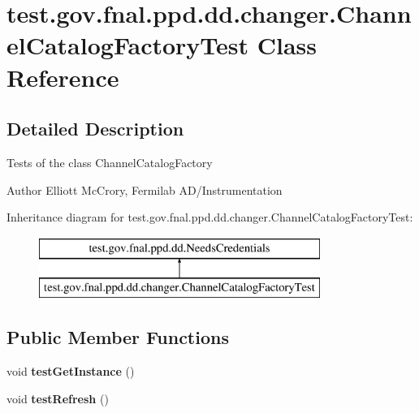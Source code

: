 \hypertarget{classtest_1_1gov_1_1fnal_1_1ppd_1_1dd_1_1changer_1_1ChannelCatalogFactoryTest}{\section{test.\-gov.\-fnal.\-ppd.\-dd.\-changer.\-Channel\-Catalog\-Factory\-Test Class Reference}
\label{classtest_1_1gov_1_1fnal_1_1ppd_1_1dd_1_1changer_1_1ChannelCatalogFactoryTest}
}


\subsection{Detailed Description}
Tests of the class Channel\-Catalog\-Factory

\begin{DoxyAuthor}{Author}
Elliott Mc\-Crory, Fermilab A\-D/\-Instrumentation 
\end{DoxyAuthor}
Inheritance diagram for test.\-gov.\-fnal.\-ppd.\-dd.\-changer.\-Channel\-Catalog\-Factory\-Test\-:\begin{figure}[H]
\begin{center}
\leavevmode
\includegraphics[height=2.000000cm]{classtest_1_1gov_1_1fnal_1_1ppd_1_1dd_1_1changer_1_1ChannelCatalogFactoryTest}
\end{center}
\end{figure}
\subsection*{Public Member Functions}
\begin{DoxyCompactItemize}
\item 
\hypertarget{classtest_1_1gov_1_1fnal_1_1ppd_1_1dd_1_1changer_1_1ChannelCatalogFactoryTest_a0f381506eaec142e6ffdd0c4ea09bcba}{void {\bfseries test\-Get\-Instance} ()}\label{classtest_1_1gov_1_1fnal_1_1ppd_1_1dd_1_1changer_1_1ChannelCatalogFactoryTest_a0f381506eaec142e6ffdd0c4ea09bcba}

\item 
\hypertarget{classtest_1_1gov_1_1fnal_1_1ppd_1_1dd_1_1changer_1_1ChannelCatalogFactoryTest_a4874cd96233775a71b46d9ff235ffb7e}{void {\bfseries test\-Refresh} ()}\label{classtest_1_1gov_1_1fnal_1_1ppd_1_1dd_1_1changer_1_1ChannelCatalogFactoryTest_a4874cd96233775a71b46d9ff235ffb7e}

\end{DoxyCompactItemize}
